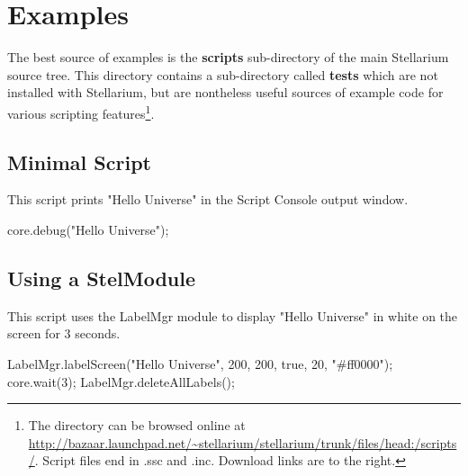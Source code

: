 \section{Examples}
\label{sec:scripting:examples}
The best source of examples is the \textbf{scripts} sub-directory of the main Stellarium source tree. This directory contains a sub-directory called \textbf{tests} which are not installed with Stellarium, but are nontheless useful sources of example code for various scripting features\footnote{The directory can be browsed online at \url{http://bazaar.launchpad.net/~stellarium/stellarium/trunk/files/head:/scripts/}. Script files end in .ssc and .inc. Download links are to the right.}.

\subsection{Minimal Script}
\label{sec:scripting:MinimalScript}
This script prints "Hello Universe" in the Script Console output window.
\begin{script}
core.debug("Hello Universe");
\end{script}

\subsection{Using a StelModule}
\label{sec:scripting:UsingStelModule}
This script uses the LabelMgr module to display "Hello Universe" in white on the screen for 3 seconds.
\begin{script}
LabelMgr.labelScreen("Hello Universe", 200, 200, true, 20, "#ff0000");
core.wait(3);
LabelMgr.deleteAllLabels();
\end{script}


